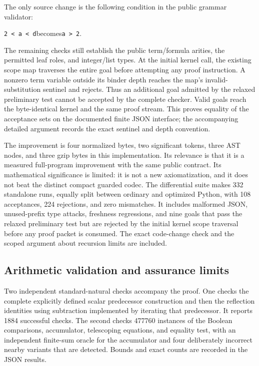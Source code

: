 The only source change is the following condition in the public grammar
validator:
\begin{center}
\texttt{2 < a < d}\quad becomes\quad\texttt{a > 2}.
\end{center}
The remaining checks still establish the public term/formula arities,
the permitted leaf roles, and integer/list types.  At the initial kernel
call, the existing scope map traverses the entire goal before attempting
any proof instruction.  A nonzero term variable outside its binder depth
reaches the map's invalid-substitution sentinel and rejects.  Thus an
additional goal admitted by the relaxed preliminary test cannot be
accepted by the complete checker.  Valid goals reach the byte-identical
kernel and the same proof stream.  This proves equality of the acceptance
sets on the documented finite JSON interface; the accompanying detailed
argument records the exact sentinel and depth convention.

The improvement is four normalized bytes, two significant tokens, three
AST nodes, and three gzip bytes in this implementation.  Its relevance is
that it is a measured full-program improvement with the same public
contract.  Its mathematical significance is limited: it is not a new
axiomatization, and it does not beat the distinct compact guarded codec.
The differential suite makes 332 standalone runs, equally split between
ordinary and optimized Python, with 108 acceptances, 224 rejections, and
zero mismatches.  It includes malformed JSON, unused-prefix type attacks,
freshness regressions, and nine goals that pass the relaxed preliminary
test but are rejected by the initial kernel scope traversal before any
proof packet is consumed.  The exact code-change check and the scoped
argument about recursion limits are included.

\subsection{Arithmetic validation and assurance limits}
Two independent standard-natural checks accompany the proof.  One checks
the complete explicitly defined scalar predecessor construction and then
the reflection identities using subtraction implemented by iterating that
predecessor.  It reports 1884 successful checks.  The second checks 477760
instances of the Boolean comparisons, accumulator, telescoping equations,
and equality test, with an independent finite-sum oracle for the
accumulator and four deliberately incorrect nearby variants that are
detected.  Bounds and exact counts are recorded in the JSON results.

